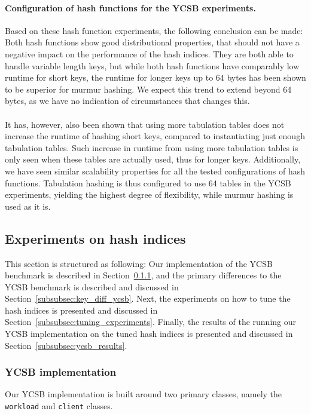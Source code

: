 \documentclass[11pt]{article} %
\begin{document}
\paragraph{Configuration of hash functions for the YCSB experiments.} Based on these hash function experiments, the following conclusion can be made: Both hash functions show good distributional properties, that should not have a negative impact on the performance of the hash indices. They are both able to handle variable length keys, but while both hash functions have comparably low runtime for short keys, the runtime for longer keys up to 64 bytes has been shown to be superior for murmur hashing. We expect this trend to extend beyond 64 bytes, as we have no indication of circumstances that changes this. \\
\\
It has, however, also been shown that using more tabulation tables does not increase the runtime of hashing short keys, compared to instantiating just enough tabulation tables. Such increase in runtime from using more tabulation tables is only seen when these tables are actually used, thus for longer keys. Additionally, we have seen similar scalability properties for all the tested configurations of hash functions. Tabulation hashing is thus configured to use 64 tables in the YCSB experiments, yielding the highest degree of flexibility, while murmur hashing is used as it is.

\subsection{Experiments on hash indices}
\label{subsec:hash_index_experiments}
This section is structured as following: Our implementation of the YCSB benchmark is described in Section~\ref{subsubsec:hash_index_ycsb_implementation}, and the primary differences to the YCSB benchmark is described and discussed in Section~\ref{subsubsec:key_diff_ycsb}. Next, the experiments on how to tune the hash indices is presented and discussed in Section~\ref{subsubsec:tuning_experiments}. Finally, the results of the running our YCSB implementation on the tuned hash indices is presented and discussed in Section~\ref{subsubsec:ycsb_results}.\\

\subsubsection{YCSB implementation}
\label{subsubsec:hash_index_ycsb_implementation}
Our YCSB implementation is built around two primary classes, namely the \verb|workload| and \verb|client| classes.\\
\end{document}
